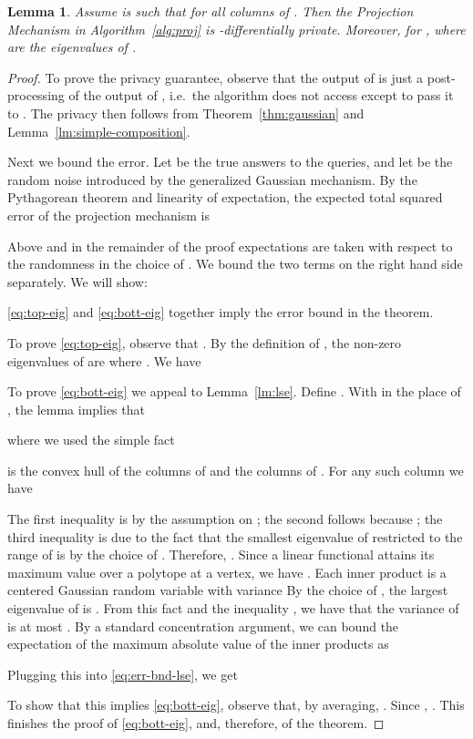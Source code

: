 \documentclass{article}
\newtheorem{lemma}{Lemma}[theorem]
\begin{document}
\begin{lemma}\label{lm:proj-err}
  Assume  is such that  for all columns  of . Then the Projection Mechanism
   in Algorithm~\ref{alg:proj} is -differentially private. Moreover, for ,
   where  are the eigenvalues of .
\end{lemma}
\begin{proof} 
  To prove the privacy guarantee, observe that the output of
   is just a post-processing of the
  output of , i.e.~the algorithm does not access 
  except to pass it to . The privacy then follows
  from Theorem~\ref{thm:gaussian} and
  Lemma~\ref{lm:simple-composition}.

  Next we bound the error. Let  be the true answers to
  the queries, and let  be the random noise introduced by the
  generalized Gaussian mechanism.  By the Pythagorean theorem and
  linearity of expectation, the expected total squared error of the
  projection mechanism is
  
  Above and in the remainder of the proof expectations are taken
  with respect to the randomness in the choice of .  We bound the
  two terms on the right hand side separately. We will show:
  
  \eqref{eq:top-eig} and \eqref{eq:bott-eig} together imply the error
  bound in the theorem.

  To prove \eqref{eq:top-eig}, observe that . By the definition of , the
  non-zero eigenvalues of  are  where . We have
  

  To prove \eqref{eq:bott-eig} we appeal to Lemma~\ref{lm:lse}. Define
  . With  in the place of
  , the lemma implies that
  
  where we used the simple fact
  
   is the convex hull of the columns of  and the
  columns of . For any such column  we have
  
  The first inequality is by the assumption on ; the second
  follows because ;
  the third inequality is due to the fact that the smallest eigenvalue
  of  restricted to the range of  is
   by the choice of . Therefore,
  . Since a linear
  functional attains its maximum value over a polytope at a vertex, we
  have . Each inner product  is a centered Gaussian random variable with variance  By the choice of , the largest
  eigenvalue of  is . From this fact and the inequality , we have that the variance of  is at most . By a
  standard concentration argument, we can bound the expectation of the
  maximum absolute value of the inner products as
  
  Plugging this into \eqref{eq:err-bnd-lse}, we get
  
  To show that this implies \eqref{eq:bott-eig}, observe that, by
  averaging, .  Since , . This finishes the
  proof of \eqref{eq:bott-eig}, and, therefore, of the theorem.
\end{proof}
\end{document}
